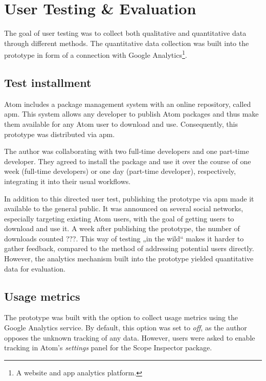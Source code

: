 \section{User Testing \& Evaluation}\label{user-testing-evaluation}

The goal of user testing was to collect both qualitative and
quantitative data through different methods. The quantitative data
collection was built into the prototype in form of a connection with
Google Analytics\footnote{A website and app analytics platform.}.

\subsection{Test installment}\label{test-installment}

Atom includes a package management system with an online repository,
called \ac{apm}. This system allows any developer to publish Atom
packages and thus make them available for any Atom user to download and
use. Consequently, this prototype was distributed via \ac{apm}.

The author was collaborating with two full-time developers and one
part-time developer. They agreed to install the package and use it over
the course of one week (full-time developers) or one day (part-time
developer), respectively, integrating it into their usual workflows.

In addition to this directed user test, publishing the prototype via
\ac{apm} made it available to the general public. It was announced on
several social networks, especially targeting existing Atom users, with
the goal of getting users to download and use it. A week after
publishing the prototype, the number of downloads counted ???. This way
of testing „in the wild“ makes it harder to gather feedback, compared to
the method of addressing potential users directly. However, the
analytics mechanism built into the prototype yielded quantitative data
for evaluation.

\subsection{Usage metrics}\label{usage-metrics}

The prototype was built with the option to collect usage metrics using
the Google Analytics service. By default, this option was set to
\emph{off}, as the author opposes the unknown tracking of any data.
However, users were asked to enable tracking in Atom’s \emph{settings}
panel for the Scope Inspector package.

